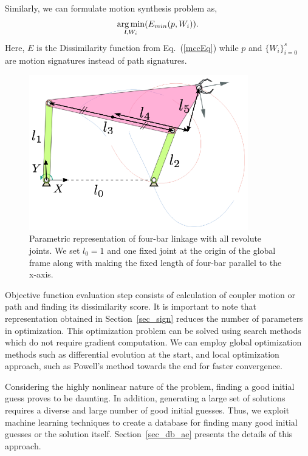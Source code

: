 \documentclass[twocolumn,10pt]{asme2ej}
\newcommand{\req}[1]{(\ref{#1})}
\DeclareMathOperator*{\argminA}{arg\,min}
\begin{document}
Similarly, we can formulate motion synthesis problem as,
\begin{equation}\label{objectiveFunMotion}
  \argminA_{\textbf{\emph{l}}, W_i} (E_{min}(p, W_i)).
\end{equation}
Here, $E$ is the Dissimilarity function from Eq.~\req{mccEq} while $p$ and ${\{W_i\}}_{i=0}^{s}$ are motion signatures instead of path signatures.

\begin{figure}
\centering
\includegraphics[width=270pt]{figure/fig_fourbar.eps}
  \caption{Parametric representation of four-bar linkage with all revolute joints. We set $l_0 = 1$ and one fixed joint at the origin of the global frame along with making the fixed length of four-bar parallel to the x-axis.}
\label{fourbar}
\end{figure}

Objective function evaluation step consists of calculation of coupler motion or path and finding its dissimilarity score.
It is important to note that representation obtained in Section~\ref{sec_sign} reduces the number of parameters in optimization.
This optimization problem can be solved using search methods which do not require gradient computation.
We can employ global optimization methods such as differential evolution at the start, and local optimization approach, such as Powell's method towards the end for faster convergence\cite{ullah1997}.

Considering the highly nonlinear nature of the problem, finding a good initial guess proves to be daunting. In addition, generating a large set of solutions requires a diverse and large number of good initial guesses.
Thus, we exploit machine learning techniques to create a database for finding many good initial guesses or the solution itself.
Section~\ref{sec_db_ae} presents the details of this approach.
\end{document}
